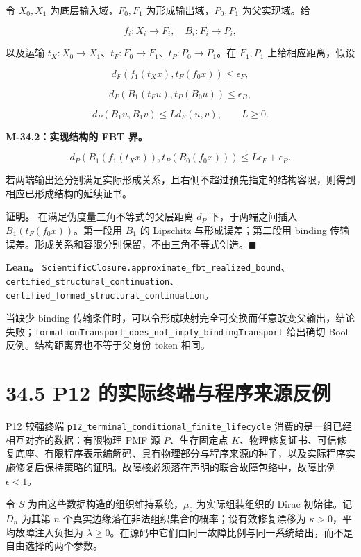 \documentclass[
  11pt,
  oneside]{book}
\begin{document}
令 \(X_0,X_1\) 为底层输入域，\(F_0,F_1\) 为形成输出域，\(P_0,P_1\) 为父实现域。给

\[f_i:X_i\to F_i,\quad B_i:F_i\to P_i,\]

以及运输 \(t_X:X_0\to X_1\)、\(t_F:F_0\to F_1\)、\(t_P:P_0\to P_1\)。在 \(F_1,P_1\) 上给相应距离，假设

\[d_F(f_1(t_Xx),t_F(f_0x))\le\epsilon_F,\]

\[d_P(B_1(t_Fu),t_P(B_0u))\le\epsilon_B,\]

\[d_P(B_1u,B_1v)\le Ld_F(u,v),\qquad L\ge0.\]

\hypertarget{m-34-2}{}\label{m-34-2}

\textbf{M-34.2：实现结构的 FBT 界。}

\[d_P(B_1(f_1(t_Xx)),t_P(B_0(f_0x)))\le L\epsilon_F+\epsilon_B.\]

若两端输出还分别满足实际形成关系，且右侧不超过预先指定的结构容限，则得到相应已形成结构的延续证书。

\textbf{证明。} 在满足伪度量三角不等式的父层距离 \(d_P\) 下，于两端之间插入 \(B_1(t_F(f_0x))\)。第一段用 \(B_1\) 的 Lipschitz 与形成误差；第二段用 binding 传输误差。形成关系和容限分别保留，不由三角不等式创造。\(\blacksquare\)

\textbf{Lean。} \nolinkurl{ScientificClosure.approximate_fbt_realized_bound}、\nolinkurl{certified_structural_continuation}、\nolinkurl{certified_formed_structural_continuation}。

当缺少 binding 传输条件时，可以令形成映射完全可交换而任意改变父输出，结论失败；\nolinkurl{formationTransport_does_not_imply_bindingTransport} 给出确切 Bool 反例。结构距离界也不等于父身份 token 相同。

\section{34.5 P12 的实际终端与程序来源反例}\label{p12-ux7684ux5b9eux9645ux7ec8ux7aefux4e0eux7a0bux5e8fux6765ux6e90ux53cdux4f8b}

P12 较强终端 \nolinkurl{p12_terminal_conditional_finite_lifecycle} 消费的是一组已经相互对齐的数据：有限物理 PMF 源 \(P\)、生存固定点 \(K\)、物理修复证书、可信修复底座、有限程序表示编解码、具有物理部分与程序来源的种子，以及实际程序实施修复后保持策略的证明。故障核必须落在声明的联合故障包络中，故障比例 \(\epsilon<1\)。

令 \(S\) 为由这些数据构造的组织维持系统，\(\mu_0\) 为实际组装组织的 Dirac 初始律。记 \(D_n\) 为其第 \(n\) 个真实边缘落在非法组织集合的概率；设有效修复漂移为 \(\kappa>0\)，平均故障注入负担为 \(\lambda\ge0\)。在源码中它们由同一故障比例与同一系统给出，而不是自由选择的两个参数。
\end{document}
